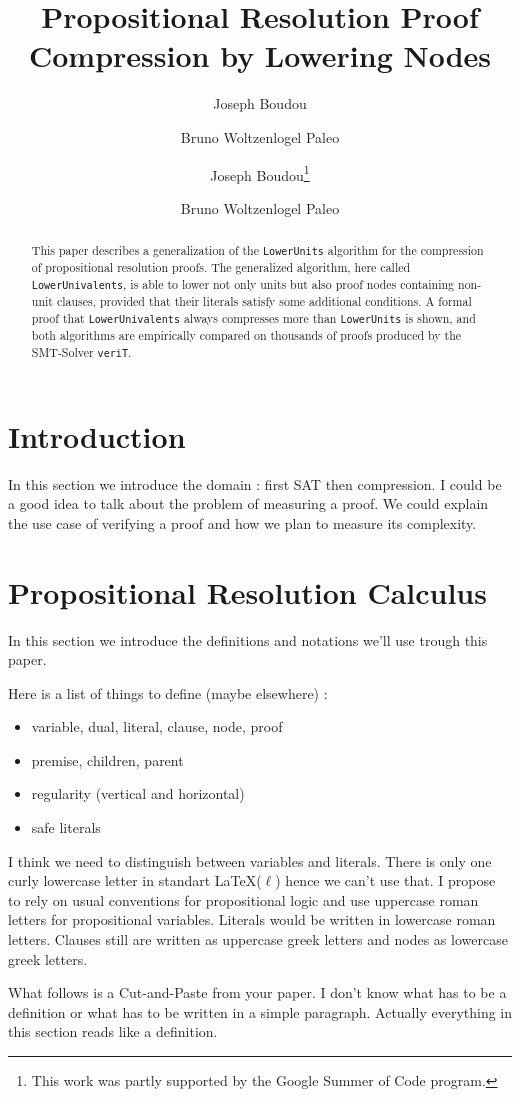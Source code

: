 \documentclass{llncs}
\title{Propositional Resolution Proof Compression by Lowering Nodes}
\author{Joseph Boudou \and Bruno Woltzenlogel Paleo}
\institute{Vienna University of Technology, Austria}
\author{
  Joseph Boudou\inst{1}\thanks{This work was partly supported by the Google Summer of Code program.}
  \and 
  Bruno Woltzenlogel Paleo\inst{2}
}
\institute{
  University of Toulouse (TODO) \\
  \email{jogo@matabio.net}
  \and 
  Vienna University of Technology \\
  \email{bruno@logic.at}
}
\newenvironment{jogo}{\color{teal}}{}
\newcommand{\LowerUnits}{\texttt{LowerUnits}}
\newcommand{\LowerUnivalents}{\texttt{LowerUnivalents}}
\newcommand{\VeriT}{\texttt{veriT}}
\begin{document}
\maketitle


\begin{abstract}
This paper describes a generalization of the {\LowerUnits} algorithm \cite{ToDo} for the compression of propositional resolution proofs. The generalized algorithm, here called {\LowerUnivalents}, is able to lower not only units but also proof nodes containing non-unit clauses, provided that their literals satisfy some additional conditions. A formal proof that {\LowerUnivalents} always compresses more than {\LowerUnits} is shown, and both algorithms are empirically compared on thousands of proofs produced by the SMT-Solver {\VeriT}.
\end{abstract}

\section{Introduction}

\begin{jogo}
In this section we introduce the domain : first SAT then compression.
I could be a good idea to talk about the problem of measuring a proof.
We could explain the use case of verifying a proof and how we plan to measure its complexity.
\end{jogo}

\section{Propositional Resolution Calculus}

\begin{jogo}
In this section we introduce the definitions and notations we'll use trough this paper.

Here is a list of things to define (maybe elsewhere) : \begin{itemize}%
    \item variable, dual, literal, clause, node, proof
    \item premise, children, parent
    \item regularity (vertical and horizontal)
    \item safe literals
\end{itemize}
\end{jogo}

\begin{jogo}
I think we need to distinguish between variables and literals. There is only one curly lowercase
letter in standart \LaTeX ($\ell$) hence we can't use that. I propose to rely on usual conventions
for propositional logic and use uppercase roman letters for propositional variables. Literals would
be written in lowercase roman letters. Clauses still are written as uppercase greek letters and nodes
as lowercase greek letters.

What follows is a Cut-and-Paste from your paper. I don't know what has to be a definition or what
has to be written in a simple paragraph. Actually everything in this section reads like a
definition.
\end{jogo}
\end{document}
